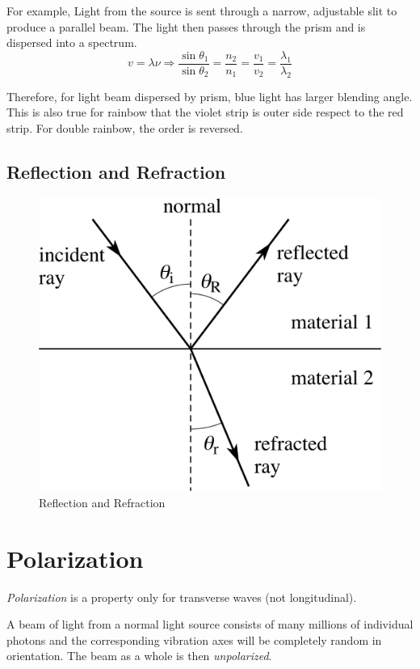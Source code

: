 \documentclass[openany]{book}
\begin{document}
For example, Light from the source is sent through a narrow, adjustable slit to produce a parallel beam. The light then passes through the prism and is dispersed into a spectrum. 
\[v=\lambda \nu \Rightarrow \frac{\sin \theta _1}{\sin \theta _2}=\frac{n_2}{n_1}=\frac{v _1}{v _2}=\frac{\lambda _1}{\lambda _2}\]

Therefore, for light beam dispersed by prism, blue light has larger blending angle. This is also true for rainbow that the violet strip is outer side respect to the red strip. For double rainbow, the order is reversed.

\subsection{Reflection and Refraction}
\begin{figure}[H]
\centering
\label{fig:13}
\includegraphics[scale=1]{Figure/13.PNG}
\caption{Reflection and Refraction}
\end{figure}
\section{Polarization}
\emph{Polarization} is a property only for transverse waves (not longitudinal).

A beam of light from a normal light source consists of many millions of individual photons and the corresponding vibration axes will be completely random in orientation. The beam as a whole is then \emph{unpolarized}.
\end{document}
